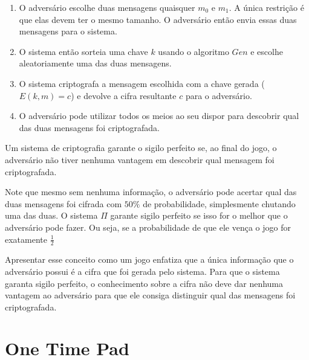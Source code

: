 \begin{enumerate}
\item O adversário escolhe duas mensagens quaisquer $m_0$ e $m_1$.
  A única restrição é que elas devem ter o mesmo tamanho.
  O adversário então envia essas duas mensagens para o sistema.
\item O sistema então sorteia uma chave $k$ usando o algoritmo $Gen$ e escolhe aleatoriamente uma das duas mensagens.
\item O sistema criptografa a mensagem escolhida com a chave gerada  ($E(k,m) = c$) e devolve a cifra resultante $c$ para o adversário.
\item O adversário pode utilizar todos os meios ao seu dispor para descobrir qual das duas mensagens foi criptografada.
\end{enumerate}

Um sistema de criptografia garante o sigilo perfeito se, ao final do jogo, o adversário não tiver nenhuma vantagem em descobrir qual mensagem foi criptografada.

\begin{center}
\end{center}

Note que mesmo sem nenhuma informação, o adversário pode acertar qual das duas mensagens foi cifrada com $50\%$ de probabilidade, simplesmente chutando uma das duas.
O sistema $\Pi$ garante sigilo perfeito se isso for o melhor que o adversário pode fazer.
Ou seja, se a probabilidade de que ele vença o jogo for exatamente $\frac{1}{2}$

Apresentar esse conceito como um jogo enfatiza que a única informação que o adversário possui é a cifra que foi gerada pelo sistema.
Para que o sistema garanta sigilo perfeito, o conhecimento sobre a cifra não deve dar nenhuma vantagem ao adversário para que ele consiga distinguir qual das mensagens foi criptografada.

\section{One Time Pad}
\label{sec:otp}

